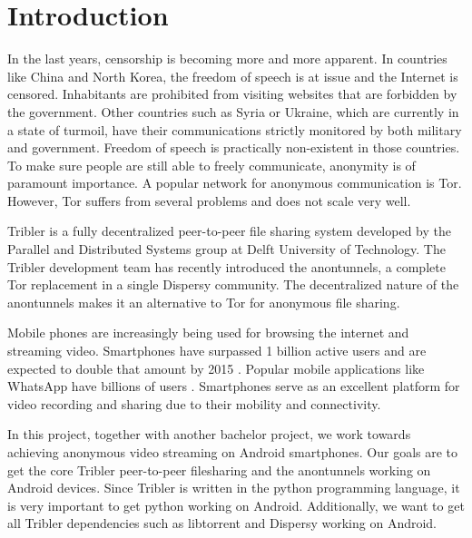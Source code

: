 \chapter{Introduction}

In the last years, censorship is becoming more and more apparent. In countries like China and North Korea, the freedom of speech is at issue and the Internet is censored. Inhabitants are prohibited from visiting websites that are forbidden by the government. Other countries such as Syria or Ukraine, which are currently in a state of turmoil, have their communications strictly monitored by both military and government. Freedom of speech is practically non-existent in those countries. To make sure people are still able to freely communicate, anonymity is of paramount importance. A popular network for anonymous communication is Tor. However, Tor suffers from several problems and does not scale very well.

Tribler is a fully decentralized peer-to-peer file sharing system developed by the Parallel and Distributed Systems group at Delft University of Technology. The Tribler development team has recently introduced the anontunnels, a complete Tor replacement in a single Dispersy community. The decentralized nature of the anontunnels makes it an alternative to Tor for anonymous file sharing.

Mobile phones are increasingly being used for browsing the internet and streaming video. Smartphones have surpassed 1 billion active users and are expected to double that amount by 2015 \cite{yang2015smartphones}. Popular mobile applications like WhatsApp have billions of users \cite{googleplayinstagram, googleplaywhatsapp}. Smartphones serve as an excellent platform for video recording and sharing due to their mobility and connectivity.

In this project, together with another bachelor project, we work towards achieving anonymous video streaming on Android smartphones. Our goals are to get the core Tribler peer-to-peer filesharing and the anontunnels working on Android devices. Since Tribler is written in the python programming language, it is very important to get python working on Android. Additionally, we want to get all Tribler dependencies such as libtorrent and Dispersy working on Android.